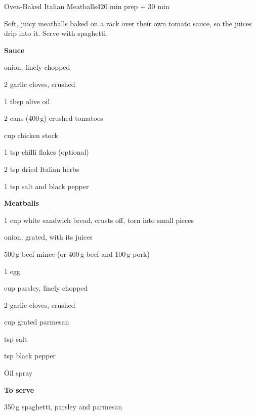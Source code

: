 \begin{recipebox}{Oven-Baked Italian Meatballs}{4}{20 min prep + 30 min}

Soft, juicy meatballs baked on a rack over their own tomato sauce, so the
juices drip into it. Serve with spaghetti.

\begin{ingredients}
  \item[] \textbf{Sauce}
  \item {} onion, finely chopped
  \item 2 garlic cloves, crushed
  \item 1 tbsp olive oil
  \item 2 cans (400\,g) crushed tomatoes
  \item {} cup chicken stock
  \item 1 tsp chilli flakes (optional)
  \item 2 tsp dried Italian herbs
  \item 1 tsp salt and black pepper
  \item[] \textbf{Meatballs}
  \item 1 cup white sandwich bread, crusts off, torn into small pieces
  \item {} onion, grated, with its juices
  \item 500\,g beef mince (or 400\,g beef and 100\,g pork)
  \item 1 egg
  \item {} cup parsley, finely chopped
  \item 2 garlic cloves, crushed
  \item {} cup grated parmesan
  \item {} tsp salt
  \item {} tsp black pepper
  \item Oil spray
  \item[] \textbf{To serve}
  \item 350\,g spaghetti, parsley and parmesan
\end{ingredients}


\end{recipebox}
